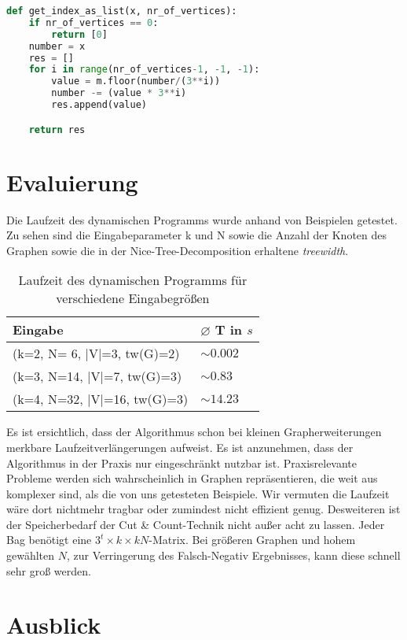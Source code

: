 \begin{svgraybox}
\begin{lstlisting}[language=python,label={code:as_list}, basicstyle=\small, caption=Funktion get\_index\_as\_list zur Berechnung der ternären Färbung aus dem Index]
def get_index_as_list(x, nr_of_vertices):
    if nr_of_vertices == 0:
        return [0]
    number = x
    res = []
    for i in range(nr_of_vertices-1, -1, -1):
        value = m.floor(number/(3**i))
        number -= (value * 3**i)
        res.append(value)

    return res
\end{lstlisting}
\end{svgraybox}

\section{Evaluierung}
\label{sec:impl_eval}
Die Laufzeit des dynamischen Programms wurde anhand von Beispielen getestet. Zu sehen sind die Eingabeparameter k und N sowie die Anzahl der Knoten des Graphen sowie die in der Nice-Tree-Decomposition erhaltene \textit{treewidth}.
\begin{table}
\centering
\begin{tabular}{l | l} 
\textbf{Eingabe} & \textbf{ $\varnothing$ T in $s$}\\
\hline
(k=2, N= 6, |V|=3, tw(G)=2) & $ \sim 0.002$ \\
(k=3, N=14, |V|=7, tw(G)=3) & $ \sim 0.83$ \\
(k=4, N=32, |V|=16, tw(G)=3) & $ \sim 14.23$ \\
\end{tabular}
\caption{Laufzeit des dynamischen Programms für verschiedene Eingabegrößen}
\end{table}

Es ist ersichtlich, dass der Algorithmus schon bei kleinen Grapherweiterungen merkbare Laufzeitverlängerungen aufweist. Es ist anzunehmen, dass der Algorithmus in der Praxis nur eingeschränkt nutzbar ist. Praxisrelevante Probleme werden sich wahrscheinlich in Graphen repräsentieren, die weit aus komplexer sind, als die von uns getesteten Beispiele. Wir vermuten die Laufzeit wäre dort nichtmehr tragbar oder zumindest nicht effizient genug. Desweiteren ist der Speicherbedarf der Cut \& Count-Technik nicht außer acht zu lassen. Jeder Bag benötigt eine $3^t\times k\times kN$-Matrix. Bei größeren Graphen und hohem gewählten $N$, zur Verringerung des Falsch-Negativ Ergebnisses, kann diese schnell sehr groß werden.

\section{Ausblick}
\label{sec:impl_outlook}


